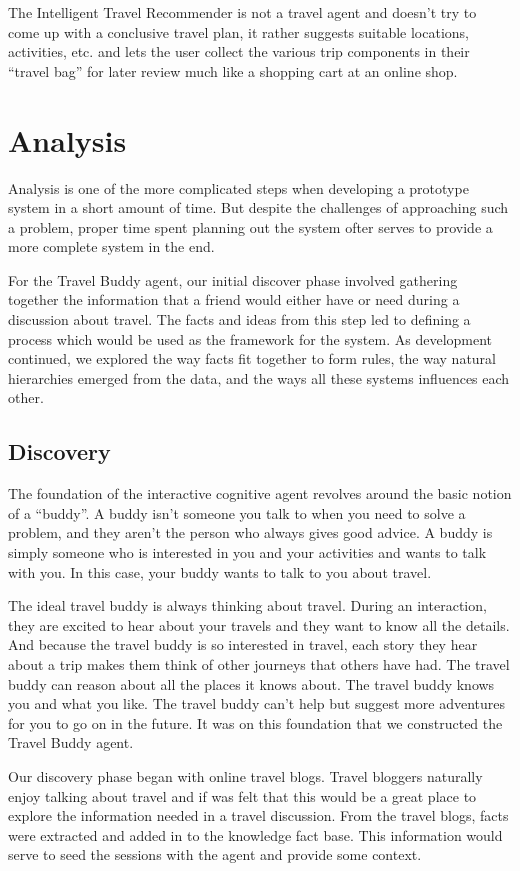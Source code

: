 \documentclass[11pt]{article} %
\begin{document}
The Intelligent Travel Recommender is not a travel agent and doesn't try to come up
with a conclusive travel plan, it rather suggests suitable
locations, activities, etc. and lets the user collect the
various trip components in their ``travel bag'' for later
review much like a shopping cart at an online shop. 

\section{Analysis}
Analysis is one of the more complicated steps when developing a prototype system in a short amount of time. But despite the challenges of approaching such a problem, proper time spent planning out the system ofter serves to provide a more complete system in the end.

For the Travel Buddy agent, our initial discover phase involved gathering together the information that a friend would either have or need during a discussion about travel. The facts and ideas from this step led to defining a process which would be used as the framework for the system. As development continued, we explored the way facts fit together to form rules, the way natural hierarchies emerged from the data, and the ways all these systems influences each other.

\subsection{Discovery}
The foundation of the interactive cognitive agent revolves around the basic notion of a ``buddy''. A buddy isn't someone you talk to when you need to solve a problem, and they aren't the person who always gives good advice. A buddy is simply someone who is interested in you and your activities and wants to talk with you. In this case, your buddy wants to talk to you about travel.

The ideal travel buddy is always thinking about travel. During an interaction, they are excited to hear about your travels and they want to know all the details. And because the travel buddy is so interested in travel, each story they hear about a trip makes them think of other journeys that others have had. The travel buddy can reason about all the places it knows about. The travel buddy knows you and what you like. The travel buddy can't help but suggest more adventures for you to go on in the future. It was on this foundation that we constructed the Travel Buddy agent.

Our discovery phase began with online travel blogs\cite{kate15}\cite{amanda15}. Travel bloggers naturally enjoy talking about travel and if was felt that this would be a great place to explore the information needed in a travel discussion. From the travel blogs, facts were extracted and added in to the knowledge fact base. This information would serve to seed the sessions with the agent and provide some context.
\end{document}
